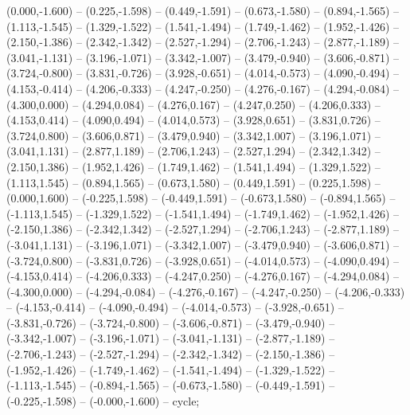  (0.000,-1.600) -- (0.225,-1.598) -- (0.449,-1.591) -- (0.673,-1.580) -- (0.894,-1.565) -- (1.113,-1.545) -- (1.329,-1.522) -- (1.541,-1.494) -- (1.749,-1.462) -- (1.952,-1.426) -- (2.150,-1.386) -- (2.342,-1.342) -- (2.527,-1.294) -- (2.706,-1.243) -- (2.877,-1.189) -- (3.041,-1.131) -- (3.196,-1.071) -- (3.342,-1.007) -- (3.479,-0.940) -- (3.606,-0.871) -- (3.724,-0.800) -- (3.831,-0.726) -- (3.928,-0.651) -- (4.014,-0.573) -- (4.090,-0.494) -- (4.153,-0.414) -- (4.206,-0.333) -- (4.247,-0.250) -- (4.276,-0.167) -- (4.294,-0.084) -- (4.300,0.000) -- (4.294,0.084) -- (4.276,0.167) -- (4.247,0.250) -- (4.206,0.333) -- (4.153,0.414) -- (4.090,0.494) -- (4.014,0.573) -- (3.928,0.651) -- (3.831,0.726) -- (3.724,0.800) -- (3.606,0.871) -- (3.479,0.940) -- (3.342,1.007) -- (3.196,1.071) -- (3.041,1.131) -- (2.877,1.189) -- (2.706,1.243) -- (2.527,1.294) -- (2.342,1.342) -- (2.150,1.386) -- (1.952,1.426) -- (1.749,1.462) -- (1.541,1.494) -- (1.329,1.522) -- (1.113,1.545) -- (0.894,1.565) -- (0.673,1.580) -- (0.449,1.591) -- (0.225,1.598) -- (0.000,1.600) -- (-0.225,1.598) -- (-0.449,1.591) -- (-0.673,1.580) -- (-0.894,1.565) -- (-1.113,1.545) -- (-1.329,1.522) -- (-1.541,1.494) -- (-1.749,1.462) -- (-1.952,1.426) -- (-2.150,1.386) -- (-2.342,1.342) -- (-2.527,1.294) -- (-2.706,1.243) -- (-2.877,1.189) -- (-3.041,1.131) -- (-3.196,1.071) -- (-3.342,1.007) -- (-3.479,0.940) -- (-3.606,0.871) -- (-3.724,0.800) -- (-3.831,0.726) -- (-3.928,0.651) -- (-4.014,0.573) -- (-4.090,0.494) -- (-4.153,0.414) -- (-4.206,0.333) -- (-4.247,0.250) -- (-4.276,0.167) -- (-4.294,0.084) -- (-4.300,0.000) -- (-4.294,-0.084) -- (-4.276,-0.167) -- (-4.247,-0.250) -- (-4.206,-0.333) -- (-4.153,-0.414) -- (-4.090,-0.494) -- (-4.014,-0.573) -- (-3.928,-0.651) -- (-3.831,-0.726) -- (-3.724,-0.800) -- (-3.606,-0.871) -- (-3.479,-0.940) -- (-3.342,-1.007) -- (-3.196,-1.071) -- (-3.041,-1.131) -- (-2.877,-1.189) -- (-2.706,-1.243) -- (-2.527,-1.294) -- (-2.342,-1.342) -- (-2.150,-1.386) -- (-1.952,-1.426) -- (-1.749,-1.462) -- (-1.541,-1.494) -- (-1.329,-1.522) -- (-1.113,-1.545) -- (-0.894,-1.565) -- (-0.673,-1.580) -- (-0.449,-1.591) -- (-0.225,-1.598) -- (-0.000,-1.600) -- cycle;
